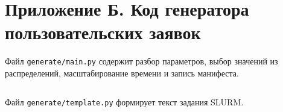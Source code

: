 \section*{Приложение Б. Код генератора пользовательских заявок}
\label{app:generator-code}

\renewcommand{\theFancyVerbLine}{%
    \scriptsize\ttfamily\textcolor{gray}{\arabic{FancyVerbLine}}%
}

Файл \texttt{generate/main.py} содержит разбор параметров, выбор значений из распределений, масштабирование времени и запись манифеста.

\inputminted[linenos, numbersep=10pt, firstnumber=1, fontsize=\scriptsize, breaklines]{python}{code/generator_main.py}

Файл \texttt{generate/template.py} формирует текст задания SLURM.

\inputminted[linenos, numbersep=10pt, firstnumber=1, fontsize=\scriptsize, breaklines]{python}{code/generator_template.py}
